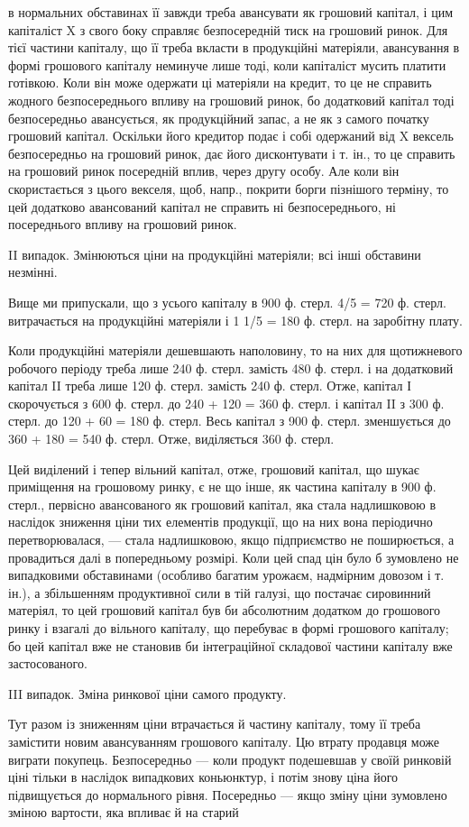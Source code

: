 \parcont{}  %
в нормальних обставинах її завжди треба авансувати як грошовий капітал,
і цим капіталіст X з свого боку справляє безпосередній тиск на грошовий
ринок. Для тієї частини капіталу, що її треба вкласти в продукційні
матеріяли, авансування в формі грошового капіталу неминуче лише
тоді, коли капіталіст мусить платити готівкою. Коли він може одержати
ці матеріяли на кредит, то це не справить жодного безпосереднього
впливу на грошовий ринок, бо додатковий капітал тоді безпосередньо
авансується, як продукційний запас, а не як з самого початку грошовий
капітал. Оскільки його кредитор подає і собі одержаний від X вексель
безпосередньо на грошовий ринок, дає його дисконтувати і т. ін., то це
справить на грошовий ринок посередній вплив, через другу особу. Але
коли він скористається з цього векселя, щоб, напр., покрити борги пізнішого
терміну, то цей додатково авансований капітал не справить ні
безпосереднього, ні посереднього впливу на грошовий ринок.

II випадок. Змінюються ціни на продукційні матеріяли; всі інші
обставини незмінні.

Вище ми припускали, що з усього капіталу в 900 ф. стерл. 4/5 = 720 ф.
стерл. витрачається на продукційні матеріяли і 1 1/5 = 180 ф. стерл. на заробітну
плату.

Коли продукційні матеріяли дешевшають наполовину, то на них для
щотижневого робочого періоду треба лише 240 ф. стерл. замість 480 ф.
стерл. і на додатковий капітал II треба лише 120 ф. стерл. замість
240 ф. стерл. Отже, капітал І скорочується з 600 ф. стерл. до 240 +
120 = 360 ф. стерл. і капітал II з 300 ф. стерл. до 120 + 60 = 180 ф.
стерл. Весь капітал з 900 ф. стерл. зменшується до 360 + 180 = 540 ф.
стерл. Отже, виділяється 360 ф. стерл.

Цей виділений і тепер вільний капітал, отже, грошовий капітал, що
шукає приміщення на грошовому ринку, є не що інше, як частина капіталу
в 900 ф. стерл., первісно авансованого як грошовий капітал, яка
стала надлишковою в наслідок зниження ціни тих елементів продукції,
що на них вона періодично перетворювалася, — стала надлишковою,
якщо підприємство не поширюється, а провадиться далі в попередньому
розмірі. Коли цей спад цін було б зумовлено не випадковими обставинами
(особливо багатим урожаєм, надмірним довозом і т. ін.), а збільшенням
продуктивної сили в тій галузі, що постачає сировинний матеріял,
то цей грошовий капітал був би абсолютним додатком до грошового
ринку і взагалі до вільного капіталу, що перебуває в формі грошового
капіталу; бо цей капітал вже не становив би інтеграційної складової частини
капіталу вже застосованого.

III випадок. Зміна ринкової ціни самого продукту.

Тут разом із зниженням ціни втрачається й частину капіталу, тому її
треба замістити новим авансуванням грошового капіталу. Цю втрату
продавця може виграти покупець. Безпосередньо — коли продукт подешевшав
у своїй ринковій ціні тільки в наслідок випадкових коньюнктур,
і потім знову ціна його підвищується до нормального рівня. Посередньо —
якщо зміну ціни зумовлено зміною вартости, яка впливає й на старий
\parbreak{}  %
